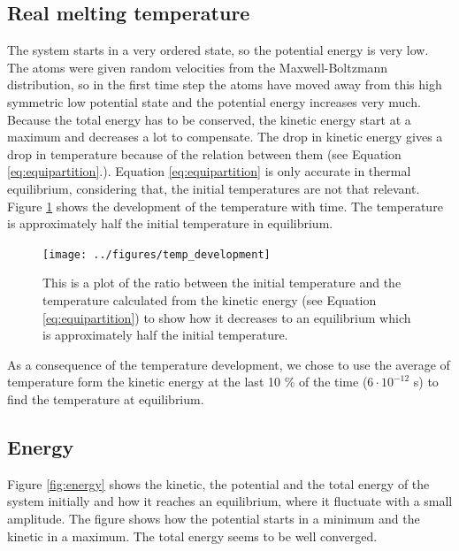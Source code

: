\subsection{Real melting temperature}

The system starts in a very ordered state, so the potential energy is very low. The atoms were given random velocities from the Maxwell-Boltzmann distribution, so in the first time step the atoms have moved away from this high symmetric low potential state and the potential energy increases very much. Because the total energy has to be conserved, the kinetic energy start at a maximum and decreases a lot to compensate. The drop in kinetic energy gives a drop in temperature because of the relation between them (see Equation \ref{eq:equipartition}.). Equation \ref{eq:equipartition} is only accurate in thermal equilibrium, considering that, the initial temperatures are not that relevant. Figure \ref{fig:temperature} shows the development of the temperature with time. The temperature is approximately half the initial temperature in equilibrium. 

\begin{figure}[H]
\center
\texttt{[image: ../figures/temp\_development]}\caption{This is a  plot of the ratio between the initial temperature and the temperature calculated from the kinetic energy (see Equation \ref{eq:equipartition}) to show how it decreases to an equilibrium which is approximately half the initial temperature.}\label{fig:temperature}
\end{figure}

As a consequence of the temperature development, we chose to use the average of temperature form the kinetic energy at the last 10 \% of the time ($6\cdot 10^{-12}$ s) to find the temperature at equilibrium.

\subsection{Energy}

Figure \ref{fig:energy} shows the kinetic, the potential and the total energy of the system initially and how it reaches an equilibrium, where it fluctuate with a small amplitude. The figure shows how the potential starts in a minimum and the kinetic in a maximum. The total energy seems to be well converged. 

